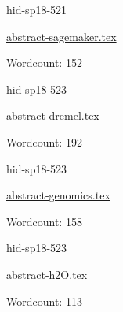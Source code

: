 

\begin{IU}

hid-sp18-521

\href{https://github.com/cloudmesh-community/hid-sp18-521/blob/master//technology/abstract-sagemaker.tex}{abstract-sagemaker.tex}

 

Wordcount: 152

\end{IU}



\begin{IU}

hid-sp18-523

\href{https://github.com/cloudmesh-community/hid-sp18-523/blob/master//technology/abstract-dremel.tex}{abstract-dremel.tex}

 

Wordcount: 192

\end{IU}



\begin{IU}

hid-sp18-523

\href{https://github.com/cloudmesh-community/hid-sp18-523/blob/master//technology/abstract-genomics.tex}{abstract-genomics.tex}

 

Wordcount: 158

\end{IU}



\begin{IU}

hid-sp18-523

\href{https://github.com/cloudmesh-community/hid-sp18-523/blob/master//technology/abstract-h2O.tex}{abstract-h2O.tex}

 

Wordcount: 113

\end{IU}



